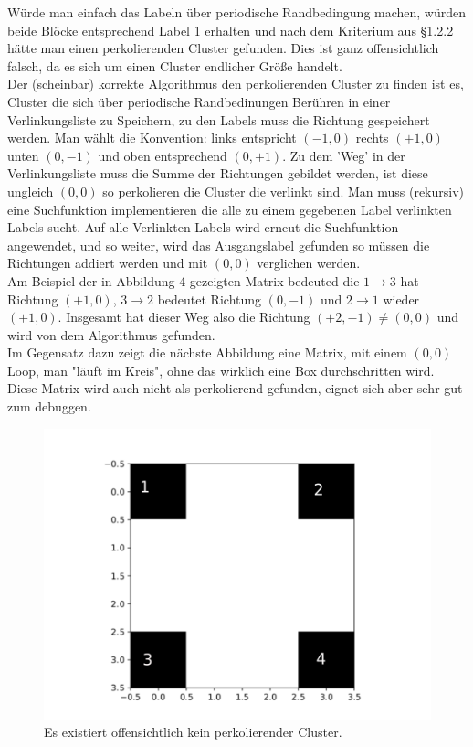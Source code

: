 \documentclass[a4paper, 12pt]{report}
\begin{document}
\vspace{0.5cm}
\noindent Würde man einfach das Labeln über periodische Randbedingung machen, würden beide Blöcke entsprechend Label 1 erhalten und nach dem Kriterium aus §1.2.2 hätte man einen perkolierenden Cluster gefunden. Dies ist ganz offensichtlich falsch, da es sich um einen Cluster endlicher Größe handelt.
\\
\noindent Der (scheinbar) korrekte Algorithmus den perkolierenden Cluster zu finden ist es, Cluster die sich über periodische Randbedinungen Berühren in einer Verlinkungsliste zu Speichern, zu den Labels muss die Richtung gespeichert werden. Man wählt die Konvention: links entspricht $(-1,0)$ rechts $(+1,0)$ unten $(0,-1)$ und oben entsprechend $(0,+1)$. Zu dem 'Weg' in der Verlinkungsliste muss die Summe der Richtungen gebildet werden, ist diese ungleich $(0,0)$ so perkolieren die Cluster die verlinkt sind. Man muss (rekursiv) eine Suchfunktion implementieren die alle zu einem gegebenen Label verlinkten Labels sucht. Auf alle Verlinkten Labels wird erneut die Suchfunktion angewendet, und so weiter, wird das Ausgangslabel gefunden so müssen die Richtungen addiert werden und mit $(0,0)$ verglichen werden.
\\
\noindent Am Beispiel der in Abbildung 4 gezeigten Matrix bedeuted die $1 \rightarrow 3$ hat Richtung $(+1,0)$, $3 \rightarrow 2$ bedeutet Richtung $(0,-1)$ und $2 \rightarrow 1$ wieder $(+1,0)$. Insgesamt hat dieser Weg also die Richtung $(+2,-1) \neq (0,0)$ und wird von dem Algorithmus gefunden.
\\
\noindent Im Gegensatz dazu zeigt die nächste Abbildung eine Matrix, mit einem $(0,0)$ Loop, man "läuft im Kreis", ohne das wirklich eine Box durchschritten wird. Diese Matrix wird auch nicht als perkolierend gefunden, eignet sich aber sehr gut zum debuggen.

\begin{figure}[h!]
	\centering
	\includegraphics[scale=0.6]{noperc2.pdf}
	\caption{Es existiert offensichtlich kein perkolierender Cluster.}
\end{figure}
\end{document}
